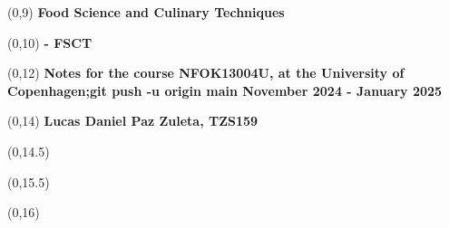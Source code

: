 \begin{titlepage}


\begin{textblock}{9.4}(0,9)
    \Huge{\sffamily\bfseries{Food Science and Culinary Techniques}}
\end{textblock}
\begin{textblock}{9.4}(0,10)
    \Huge{\sffamily\bfseries{- FSCT}}
\end{textblock}

\begin{textblock}{9.4}(0,12)
    \LARGE{\sffamily\bfseries{Notes for the course NFOK13004U, at the University of Copenhagen;git push -u origin main November 2024 - January 2025}}
\end{textblock}

\begin{textblock}{9.4}(0,14)
    \large{\sffamily\bfseries{Lucas Daniel Paz Zuleta, TZS159}}
\end{textblock}

\begin{textblock}{9.4}(0,14.5)
    \large{}
\end{textblock}

\begin{textblock}{9.4}(0,15.5)
    \large{}
\end{textblock}

\begin{textblock}{8.4}(0,16)
    \large{}
\end{textblock}


\end{titlepage}
